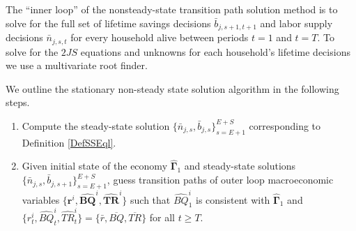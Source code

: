   The ``inner loop'' of the nonsteady-state transition path solution method is to solve for the full set of lifetime savings decisions $\bar{b}_{j,s+1,t+1}$ and labor supply decisions $\bar{n}_{j,s,t}$ for every household alive between periods $t=1$ and $t=T$.  To solve for the $2JS$ equations and unknowns for each household's lifetime decisions we use a multivariate root finder.

  We outline the stationary non-steady state solution algorithm in the following steps.

  \begin{enumerate}
    \item Compute the steady-state solution $\{\bar{n}_{j,s},\bar{b}_{j,s}\}_{s=E+1}^{E+S}$ corresponding to Definition \ref{DefSSEql}.

    \item Given initial state of the economy $\bm{\hat{\Gamma}}_1$ and steady-state solutions $\{\bar{n}_{j,s},\bar{b}_{j,s+1}\}_{s=E+1}^{E+S}$, guess transition paths of outer loop macroeconomic variables $\{\bm{r}^i,\bm{\hat{BQ}}^i, \bm{\hat{TR}}^i\}$ such that $\hat{BQ}_1^i$ is consistent with $\bm{\hat{\Gamma}}_1$ and $\{r_t^i, \hat{BQ}_t^i, \hat{TR}_t^i\} = \{\bar{r}, \overline{BQ}, \overline{TR}\}$ for all $t\geq T$.


\end{enumerate}
